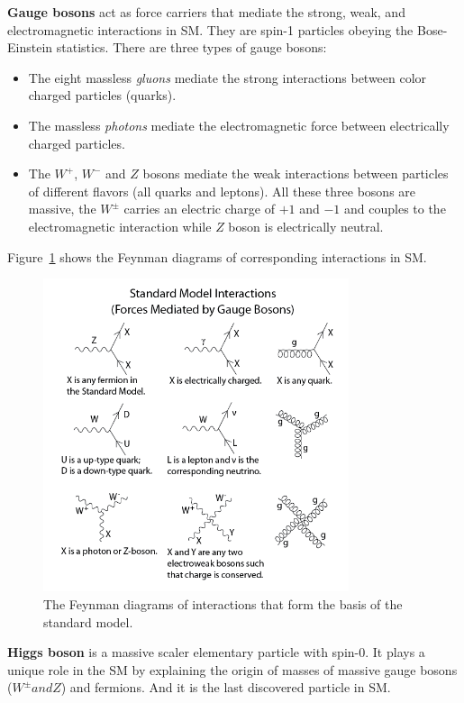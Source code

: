 \textbf{Gauge bosons}
act as force carriers that mediate the strong, weak, and electromagnetic interactions in SM.
They are spin-1 particles obeying the Bose-Einstein statistics. 
There are three types of gauge bosons:
\begin{itemize}
  \item The eight massless \textit{gluons} mediate the strong interactions between color charged particles (quarks).
  \item The massless \textit{photons} mediate the electromagnetic force between electrically charged particles.
  \item The $W^{+}$, $W^{-}$ and $Z$ bosons mediate the weak interactions between particles of different flavors (all quarks and leptons). All these three bosons are massive, the $W^{\pm}$ carries an electric charge of $+1$ and $−1$ and couples to the electromagnetic interaction while $Z$ boson is electrically neutral.
\end{itemize}
Figure~\ref{fig:eleP-2} shows the Feynman diagrams of corresponding interactions in SM.
\begin{figure}[!htb]
  \centering
  \includegraphics[width=0.8\textwidth]{figures/Theory/Standard_Model_Feynman_Diagram_Vertices.png}
  \caption{The Feynman diagrams of interactions that form the basis of the standard model.}
  \label{fig:eleP-2}
\end{figure}

\textbf{Higgs boson}
is a massive scaler elementary particle with spin-0. 
It plays a unique role in the SM by explaining the origin of masses of massive gauge bosons ($W^{\pm} and Z$) and fermions. 
And it is the last discovered particle in SM.
